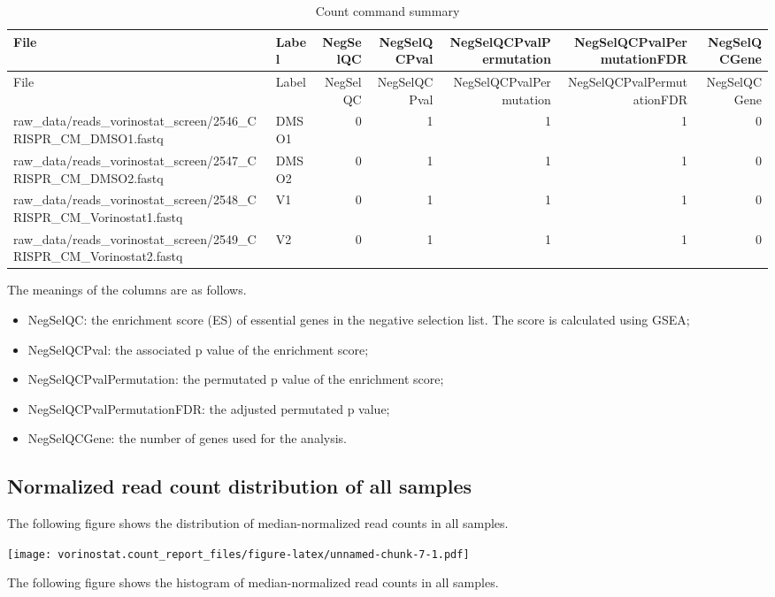 \documentclass[]{article}
\providecommand{\tightlist}{%
  \setlength{\itemsep}{0pt}\setlength{\parskip}{0pt}}
\begin{document}
\begin{longtable}[]{@{}llrrrrr@{}}
\caption{Count command summary}\tabularnewline
\toprule
File & Label & NegSelQC & NegSelQCPval & NegSelQCPvalPermutation &
NegSelQCPvalPermutationFDR & NegSelQCGene\tabularnewline
\midrule
\endfirsthead
\toprule
File & Label & NegSelQC & NegSelQCPval & NegSelQCPvalPermutation &
NegSelQCPvalPermutationFDR & NegSelQCGene\tabularnewline
\midrule
\endhead
raw\_data/reads\_vorinostat\_screen/2546\_CRISPR\_CM\_DMSO1.fastq &
DMSO1 & 0 & 1 & 1 & 1 & 0\tabularnewline
raw\_data/reads\_vorinostat\_screen/2547\_CRISPR\_CM\_DMSO2.fastq &
DMSO2 & 0 & 1 & 1 & 1 & 0\tabularnewline
raw\_data/reads\_vorinostat\_screen/2548\_CRISPR\_CM\_Vorinostat1.fastq
& V1 & 0 & 1 & 1 & 1 & 0\tabularnewline
raw\_data/reads\_vorinostat\_screen/2549\_CRISPR\_CM\_Vorinostat2.fastq
& V2 & 0 & 1 & 1 & 1 & 0\tabularnewline
\bottomrule
\end{longtable}

The meanings of the columns are as follows.

\begin{itemize}
\tightlist
\item
  NegSelQC: the enrichment score (ES) of essential genes in the negative
  selection list. The score is calculated using GSEA;
\item
  NegSelQCPval: the associated p value of the enrichment score;
\item
  NegSelQCPvalPermutation: the permutated p value of the enrichment
  score;
\item
  NegSelQCPvalPermutationFDR: the adjusted permutated p value;
\item
  NegSelQCGene: the number of genes used for the analysis.
\end{itemize}

\hypertarget{normalized-read-count-distribution-of-all-samples}{%
\subsection{Normalized read count distribution of all
samples}\label{normalized-read-count-distribution-of-all-samples}}

The following figure shows the distribution of median-normalized read
counts in all samples.

\texttt{[image: vorinostat.count\_report\_files/figure-latex/unnamed-chunk-7-1.pdf]}

The following figure shows the histogram of median-normalized read
counts in all samples.
\end{document}
